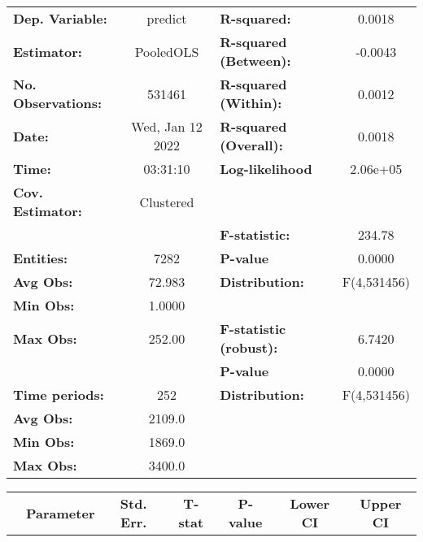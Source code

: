 \begin{center}
\begin{tabular}{lclc}
\toprule
\textbf{Dep. Variable:}    &      predict       & \textbf{  R-squared:         }   &      0.0018      \\
\textbf{Estimator:}        &     PooledOLS      & \textbf{  R-squared (Between):}  &     -0.0043      \\
\textbf{No. Observations:} &       531461       & \textbf{  R-squared (Within):}   &      0.0012      \\
\textbf{Date:}             &  Wed, Jan 12 2022  & \textbf{  R-squared (Overall):}  &      0.0018      \\
\textbf{Time:}             &      03:31:10      & \textbf{  Log-likelihood     }   &     2.06e+05     \\
\textbf{Cov. Estimator:}   &     Clustered      & \textbf{                     }   &                  \\
\textbf{}                  &                    & \textbf{  F-statistic:       }   &      234.78      \\
\textbf{Entities:}         &        7282        & \textbf{  P-value            }   &      0.0000      \\
\textbf{Avg Obs:}          &       72.983       & \textbf{  Distribution:      }   &   F(4,531456)    \\
\textbf{Min Obs:}          &       1.0000       & \textbf{                     }   &                  \\
\textbf{Max Obs:}          &       252.00       & \textbf{  F-statistic (robust):} &      6.7420      \\
\textbf{}                  &                    & \textbf{  P-value            }   &      0.0000      \\
\textbf{Time periods:}     &        252         & \textbf{  Distribution:      }   &   F(4,531456)    \\
\textbf{Avg Obs:}          &       2109.0       & \textbf{                     }   &                  \\
\textbf{Min Obs:}          &       1869.0       & \textbf{                     }   &                  \\
\textbf{Max Obs:}          &       3400.0       & \textbf{                     }   &                  \\
\bottomrule
\end{tabular}
\begin{tabular}{lcccccc}
                & \textbf{Parameter} & \textbf{Std. Err.} & \textbf{T-stat} & \textbf{P-value} & \textbf{Lower CI} & \textbf{Upper CI}  \\

\end{tabular}
\end{center}
